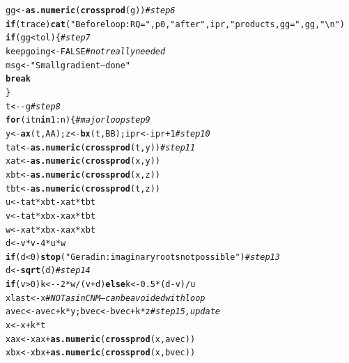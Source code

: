 \documentclass[10pt]{article}\usepackage[]{graphicx}\usepackage[]{color}
\makeatletter
\newcommand{\hlnum}[1]{\textcolor[rgb]{0.686,0.059,0.569}{#1}}%
\newcommand{\hlstr}[1]{\textcolor[rgb]{0.192,0.494,0.8}{#1}}%
\newcommand{\hlcom}[1]{\textcolor[rgb]{0.678,0.584,0.686}{\textit{#1}}}%
\newcommand{\hlopt}[1]{\textcolor[rgb]{0,0,0}{#1}}%
\newcommand{\hlstd}[1]{\textcolor[rgb]{0.345,0.345,0.345}{#1}}%
\newcommand{\hlkwa}[1]{\textcolor[rgb]{0.161,0.373,0.58}{\textbf{#1}}}%
\newcommand{\hlkwb}[1]{\textcolor[rgb]{0.69,0.353,0.396}{#1}}%
\newcommand{\hlkwd}[1]{\textcolor[rgb]{0.737,0.353,0.396}{\textbf{#1}}}%
\newenvironment{kframe}{%
 \def\at@end@of@kframe{}%
 \ifinner\ifhmode%
  \def\at@end@of@kframe{\end{minipage}}%
  \begin{minipage}{\columnwidth}%
 \fi\fi%
 \def\FrameCommand##1{\hskip\@totalleftmargin \hskip-\fboxsep
 \colorbox{shadecolor}{##1}\hskip-\fboxsep
     \hskip-\linewidth \hskip-\@totalleftmargin \hskip\columnwidth}%
 \MakeFramed {\advance\hsize-\width
   \@totalleftmargin\z@ \linewidth\hsize
   \@setminipage}}%
 {\par\unskip\endMakeFramed%
 \at@end@of@kframe}
\newenvironment{knitrout}{}{} %
\makeatother
\begin{document}
\begin{knitrout}
\begin{kframe}
\begin{alltt}
    \hlstd{gg}\hlkwb{<-}\hlkwd{as.numeric}\hlstd{(}\hlkwd{crossprod}\hlstd{(g))} \hlcom{# step 6}
    \hlkwa{if} \hlstd{(trace)} \hlkwd{cat}\hlstd{(}\hlstr{"Before loop: RQ="}\hlstd{,p0,}\hlstr{" after "}\hlstd{,ipr,}\hlstr{" products, gg="}\hlstd{,gg,}\hlstr{"\textbackslash{}n"}\hlstd{)}
    \hlkwa{if} \hlstd{(gg}\hlopt{<}\hlstd{tol) \{} \hlcom{# step 7}
       \hlstd{keepgoing}\hlkwb{<-}\hlnum{FALSE} \hlcom{# not really needed}
       \hlstd{msg}\hlkwb{<-}\hlstr{"Small gradient -- done"}
       \hlkwa{break}
    \hlstd{\}}
    \hlstd{t}\hlkwb{<-} \hlopt{-}\hlstd{g} \hlcom{# step 8}
    \hlkwa{for} \hlstd{(itn} \hlkwa{in} \hlnum{1}\hlopt{:}\hlstd{n) \{} \hlcom{# major loop step 9}
       \hlstd{y}\hlkwb{<-}\hlkwd{ax}\hlstd{(t, AA); z}\hlkwb{<-}\hlkwd{bx}\hlstd{(t, BB); ipr}\hlkwb{<-}\hlstd{ipr}\hlopt{+}\hlnum{1} \hlcom{# step 10}
       \hlstd{tat}\hlkwb{<-}\hlkwd{as.numeric}\hlstd{(}\hlkwd{crossprod}\hlstd{(t, y))} \hlcom{# step 11}
       \hlstd{xat}\hlkwb{<-}\hlkwd{as.numeric}\hlstd{(}\hlkwd{crossprod}\hlstd{(x, y))}
       \hlstd{xbt}\hlkwb{<-}\hlkwd{as.numeric}\hlstd{(}\hlkwd{crossprod}\hlstd{(x, z))}
       \hlstd{tbt}\hlkwb{<-}\hlkwd{as.numeric}\hlstd{(}\hlkwd{crossprod}\hlstd{(t, z))}
       \hlstd{u}\hlkwb{<-}\hlstd{tat}\hlopt{*}\hlstd{xbt}\hlopt{-}\hlstd{xat}\hlopt{*}\hlstd{tbt}
       \hlstd{v}\hlkwb{<-}\hlstd{tat}\hlopt{*}\hlstd{xbx}\hlopt{-}\hlstd{xax}\hlopt{*}\hlstd{tbt}
       \hlstd{w}\hlkwb{<-}\hlstd{xat}\hlopt{*}\hlstd{xbx}\hlopt{-}\hlstd{xax}\hlopt{*}\hlstd{xbt}
       \hlstd{d}\hlkwb{<-}\hlstd{v}\hlopt{*}\hlstd{v}\hlopt{-}\hlnum{4}\hlopt{*}\hlstd{u}\hlopt{*}\hlstd{w}
       \hlkwa{if} \hlstd{(d}\hlopt{<}\hlnum{0}\hlstd{)} \hlkwd{stop}\hlstd{(}\hlstr{"Geradin: imaginary roots not possible"}\hlstd{)} \hlcom{# step 13}
       \hlstd{d}\hlkwb{<-}\hlkwd{sqrt}\hlstd{(d)} \hlcom{# step 14}
       \hlkwa{if} \hlstd{(v}\hlopt{>}\hlnum{0}\hlstd{) k}\hlkwb{<-}\hlopt{-}\hlnum{2}\hlopt{*}\hlstd{w}\hlopt{/}\hlstd{(v}\hlopt{+}\hlstd{d)} \hlkwa{else} \hlstd{k}\hlkwb{<-}\hlnum{0.5}\hlopt{*}\hlstd{(d}\hlopt{-}\hlstd{v)}\hlopt{/}\hlstd{u}
       \hlstd{xlast}\hlkwb{<-}\hlstd{x} \hlcom{# NOT as in CNM -- can be avoided with loop}
       \hlstd{avec}\hlkwb{<-}\hlstd{avec}\hlopt{+}\hlstd{k}\hlopt{*}\hlstd{y; bvec}\hlkwb{<-}\hlstd{bvec}\hlopt{+}\hlstd{k}\hlopt{*}\hlstd{z} \hlcom{# step 15, update}
       \hlstd{x}\hlkwb{<-}\hlstd{x}\hlopt{+}\hlstd{k}\hlopt{*}\hlstd{t}
       \hlstd{xax}\hlkwb{<-}\hlstd{xax}\hlopt{+}\hlkwd{as.numeric}\hlstd{(}\hlkwd{crossprod}\hlstd{(x,avec))}
       \hlstd{xbx}\hlkwb{<-}\hlstd{xbx}\hlopt{+}\hlkwd{as.numeric}\hlstd{(}\hlkwd{crossprod}\hlstd{(x,bvec))}

\end{alltt}
\end{kframe}
\end{knitrout}
\end{document}
